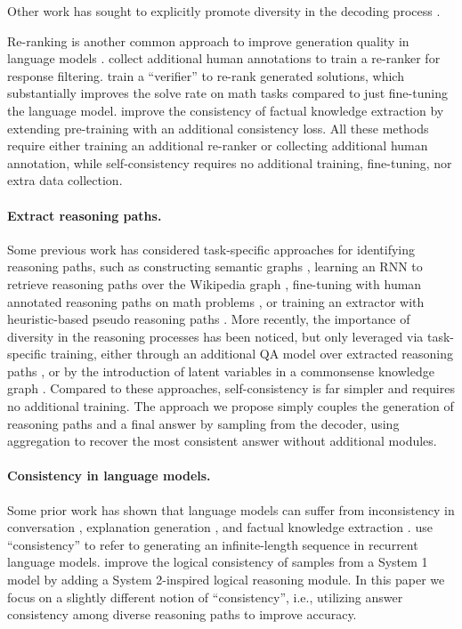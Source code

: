 Other work has sought to explicitly promote diversity in the decoding process \citep{10.1007/978-3-642-33715-4_1,DBLP:journals/corr/LiMJ16,diverse_beam}.

Re-ranking is another common approach to improve generation quality in language models \citep{adiwardana2020humanlike,shen-etal-2021-generate-rank}.
\citet{thoppilan2022lamda} collect additional human annotations to train a re-ranker for response filtering.
\citet{cobbe2021training} train a ``verifier'' to re-rank generated solutions, which substantially improves the solve rate on math tasks compared to just fine-tuning the language model.
\citet{elazar-etal-2021-measuring} improve the consistency of factual knowledge extraction by extending pre-training with an additional consistency loss. All these methods require either training an additional re-ranker or collecting additional human annotation, while self-consistency requires no additional training, fine-tuning, nor  extra data collection.

\paragraph{Extract reasoning paths.} Some previous work has considered task-specific approaches for identifying reasoning paths, such as constructing semantic graphs \citep{xu-etal-2021-exploiting-reasoning}, learning an RNN to retrieve reasoning paths over the Wikipedia graph \citep{Asai2020Learning}, fine-tuning with human annotated reasoning paths on math problems \citep{cobbe2021training}, or training an extractor with heuristic-based pseudo reasoning paths \citep{DBLP:journals/corr/abs-1910-02610}. More recently, the importance of diversity in the reasoning processes has been noticed, but only leveraged via task-specific training, either through an additional QA model over extracted reasoning paths \citep{DBLP:journals/corr/abs-1910-02610}, or by the introduction of latent variables in a commonsense knowledge graph \citep{yu2022diversifying}. Compared to these approaches, self-consistency is far simpler and requires no additional training. The approach we propose simply couples the generation of reasoning paths and a final answer  by sampling from the decoder, using aggregation to recover  the most consistent answer without additional modules.

\paragraph{Consistency in language models.} Some prior work has shown that language models can suffer from inconsistency in conversation \citep{adiwardana2020humanlike}, explanation generation \citep{camburu-etal-2020-make}, and factual knowledge extraction \citep{elazar-etal-2021-measuring}. \cite{welleck-etal-2020-consistency} use ``consistency'' to refer to generating an infinite-length sequence in recurrent language models. \cite{nye2021improving} improve the logical consistency of samples from a System 1 model by adding a System 2-inspired logical reasoning module. In this paper we focus on a slightly different notion of ``consistency'', i.e., utilizing answer consistency among diverse reasoning paths to improve accuracy.

